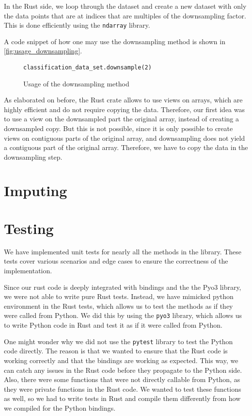 \documentclass[review]{AIM_report}
\begin{document}
In the Rust side, we loop through the dataset and create a new dataset with only the data points that are at indices that are multiples of the downsampling factor. This is done efficiently using the \texttt{ndarray} library.

A code snippet of how one may use the downsampling method is shown in \autoref{fig:usage_downsampling}.
\begin{figure}[H]
    \begin{lstlisting}[style=python]
classification_data_set.downsample(2)
    \end{lstlisting}
    \caption{Usage of the downsampling method}
    \label{fig:usage_downsampling}
\end{figure}

As elaborated on before, the Rust \numpy crate allows to use views on arrays, which are highly efficient and do not require copying the data. Therefore, our first idea was to use a view on the downsampled part the original array, instead of creating a downsampled copy. But this is not possible, since it is only possible to create views on contiguous parts of the original array, and downsampling does not yield a contiguous part of the original array. Therefore, we have to copy the data in the downsampling step.

\newpage
\section{Imputing}

\newpage
\section{Testing}
We have implemented unit tests for nearly all the methods in the library. These tests cover various scenarios and edge cases to ensure the correctness of the implementation.

Since our rust code is deeply integrated with bindings and the the Pyo3 library, we were not able to write pure Rust tests. Instead, we have mimicked python environment in the Rust tests, which allows us to test the methods as if they were called from Python.
We did this by using the \texttt{pyo3} library, which allows us to write Python code in Rust and test it as if it were called from Python.

One might wonder why we did not use the \texttt{pytest} library to test the Python code directly. The reason is that we wanted to ensure that the Rust code is working correctly and that the bindings are working as expected. This way, we can catch any issues in the Rust code before they propagate to the Python side.
Also, there were some functions that were not directly callable from Python, as they were private functions in the Rust code. We wanted to test these functions as well, so we had to write tests in Rust and compile them differently from how we compiled for the Python bindings.
\end{document}
